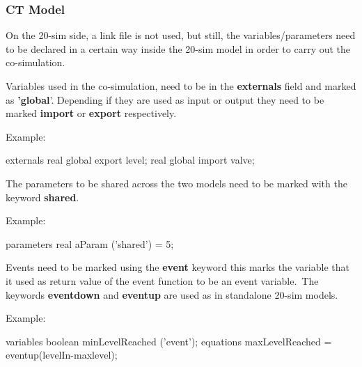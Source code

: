 \documentclass{crescendorepchap}
\newcommand{\vdmkeyw}[1]{{\bf\ttfamily #1}}
\begin{document}
\subsubsection{CT Model}

On the 20-sim side, a link file is not used, but still, the
variables/parameters need to be declared in a certain way inside the 20-sim model in order to
carry out the co-simulation.


Variables used in the co-simulation, need to be in the
\vdmkeyw{externals} field and marked as \vdmkeyw{'global}'. Depending if
they are used as input or output they need to be marked
\vdmkeyw{import} or \vdmkeyw{export} respectively.

Example:

\begin{dcl}
externals
  real global export level;
  real global import valve;
\end{dcl}


The parameters to be shared across the two models need to be marked with
the keyword \vdmkeyw{shared}.

Example:

\begin{dcl}
parameters
  real aParam ('shared') = 5; 
\end{dcl}


Events need to be marked using the \vdmkeyw{event} keyword this marks
the variable that it used as return value of the event function to be an
event variable.~The keywords \vdmkeyw{eventdown} and \vdmkeyw{eventup}
are used as in standalone 20-sim models. 

Example:

\begin{dcl}
variables
  boolean minLevelReached ('event');
equations
  maxLevelReached = eventup(levelIn-maxlevel);
\end{dcl}
\end{document}
